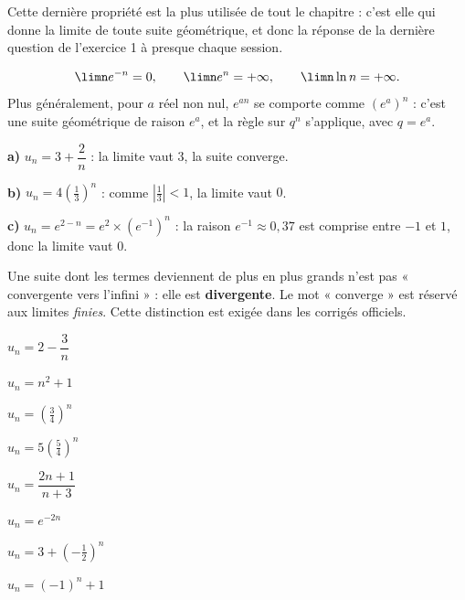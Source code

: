 \begin{remarque}
Cette dernière propriété est la plus utilisée de tout le chapitre : c'est
elle qui donne la limite de toute suite géométrique, et donc la réponse de
la dernière question de l'exercice 1 à presque chaque session.
\end{remarque}

\begin{propriete}
\[
  \limn e^{-n} = 0, \qquad \limn e^{n} = +\infty, \qquad
  \limn \ln n = +\infty .
\]
Plus généralement, pour $a$ réel non nul, $e^{an}$ se comporte comme
$\left(e^{a}\right)^{n}$ : c'est une suite géométrique de raison $e^{a}$, et
la règle sur $q^{n}$ s'applique, avec $q = e^{a}$.
\end{propriete}

\begin{exemple}
\textbf{a)} $u_{n} = 3+\dfrac{2}{n}$ : la limite vaut $3$, la suite
converge.

\textbf{b)} $u_{n} = 4\left(\frac13\right)^{n}$ : comme
$\left|\frac13\right|<1$, la limite vaut $0$.

\textbf{c)} $u_{n} = e^{2-n} = e^{2}\times\left(e^{-1}\right)^{n}$ : la
raison $e^{-1} \approx 0{,}37$ est comprise entre $-1$ et $1$, donc la
limite vaut $0$.
\end{exemple}

\begin{erreurclassique}
Une suite dont les termes deviennent de plus en plus grands n'est pas
« convergente vers l'infini » : elle est \textbf{divergente}. Le mot
« converge » est réservé aux limites \emph{finies}. Cette distinction est
exigée dans les corrigés officiels.
\end{erreurclassique}

\begin{entrainement}[limites]
\exo[\niveau{1}] $u_{n} = 2-\dfrac3n$

\exo[\niveau{1}] $u_{n} = n^{2}+1$

\exo[\niveau{2}] $u_{n} = \left(\frac34\right)^{n}$

\exo[\niveau{2}] $u_{n} = 5\left(\frac54\right)^{n}$

\exo[\niveau{2}] $u_{n} = \dfrac{2n+1}{n+3}$

\exo[\niveau{3}] $u_{n} = e^{-2n}$

\exo[\niveau{3}] $u_{n} = 3+\left(-\frac12\right)^{n}$

\exo[\niveau{3}] $u_{n} = (-1)^{n}+1$
\end{entrainement}

